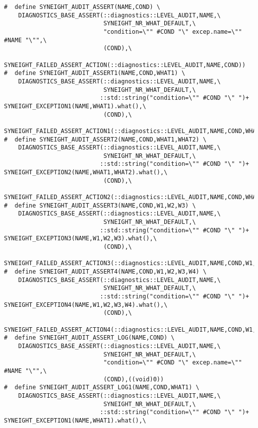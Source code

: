 \begin{verbatim}
#  define SYNEIGHT_AUDIT_ASSERT(NAME,COND) \
    DIAGNOSTICS_BASE_ASSERT(::diagnostics::LEVEL_AUDIT,NAME,\
                            SYNEIGHT_NR_WHAT_DEFAULT,\
                            "condition=\"" #COND "\" excep.name=\"" #NAME "\"",\
                            (COND),\
                            SYNEIGHT_FAILED_ASSERT_ACTION(::diagnostics::LEVEL_AUDIT,NAME,COND))
#  define SYNEIGHT_AUDIT_ASSERT1(NAME,COND,WHAT1) \
    DIAGNOSTICS_BASE_ASSERT(::diagnostics::LEVEL_AUDIT,NAME,\
                            SYNEIGHT_NR_WHAT_DEFAULT,\
                           ::std::string("condition=\"" #COND "\" ")+ SYNEIGHT_EXCEPTION1(NAME,WHAT1).what(),\
                            (COND),\
                            SYNEIGHT_FAILED_ASSERT_ACTION1(::diagnostics::LEVEL_AUDIT,NAME,COND,WHAT1))
#  define SYNEIGHT_AUDIT_ASSERT2(NAME,COND,WHAT1,WHAT2) \
    DIAGNOSTICS_BASE_ASSERT(::diagnostics::LEVEL_AUDIT,NAME,\
                            SYNEIGHT_NR_WHAT_DEFAULT,\
                           ::std::string("condition=\"" #COND "\" ")+ SYNEIGHT_EXCEPTION2(NAME,WHAT1,WHAT2).what(),\
                            (COND),\
                            SYNEIGHT_FAILED_ASSERT_ACTION2(::diagnostics::LEVEL_AUDIT,NAME,COND,WHAT1,WHAT2))
#  define SYNEIGHT_AUDIT_ASSERT3(NAME,COND,W1,W2,W3) \
    DIAGNOSTICS_BASE_ASSERT(::diagnostics::LEVEL_AUDIT,NAME,\
                            SYNEIGHT_NR_WHAT_DEFAULT,\
                           ::std::string("condition=\"" #COND "\" ")+ SYNEIGHT_EXCEPTION3(NAME,W1,W2,W3).what(),\
                            (COND),\
                            SYNEIGHT_FAILED_ASSERT_ACTION3(::diagnostics::LEVEL_AUDIT,NAME,COND,W1,W2,W3))
#  define SYNEIGHT_AUDIT_ASSERT4(NAME,COND,W1,W2,W3,W4) \
    DIAGNOSTICS_BASE_ASSERT(::diagnostics::LEVEL_AUDIT,NAME,\
                            SYNEIGHT_NR_WHAT_DEFAULT,\
                           ::std::string("condition=\"" #COND "\" ")+ SYNEIGHT_EXCEPTION4(NAME,W1,W2,W3,W4).what(),\
                            (COND),\
                            SYNEIGHT_FAILED_ASSERT_ACTION4(::diagnostics::LEVEL_AUDIT,NAME,COND,W1,W2,W3,W4))
#  define SYNEIGHT_AUDIT_ASSERT_LOG(NAME,COND) \
    DIAGNOSTICS_BASE_ASSERT(::diagnostics::LEVEL_AUDIT,NAME,\
                            SYNEIGHT_NR_WHAT_DEFAULT,\
                            "condition=\"" #COND "\" excep.name=\"" #NAME "\"",\
                            (COND),((void)0))
#  define SYNEIGHT_AUDIT_ASSERT_LOG1(NAME,COND,WHAT1) \
    DIAGNOSTICS_BASE_ASSERT(::diagnostics::LEVEL_AUDIT,NAME,\
                            SYNEIGHT_NR_WHAT_DEFAULT,\
                           ::std::string("condition=\"" #COND "\" ")+ SYNEIGHT_EXCEPTION1(NAME,WHAT1).what(),\

\end{verbatim}

